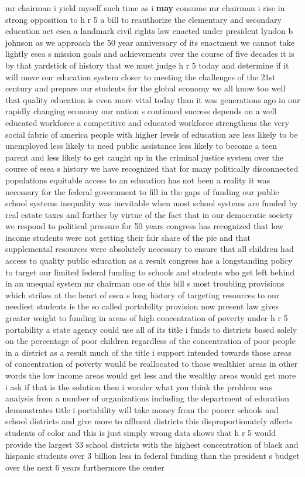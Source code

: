 \documentclass{article}
\begin{document}
\vspace{8mm}
mr chairman i yield myself such time as i {\bf \color{red} may} consume mr chairman i rise in strong opposition to h r 5 a bill to reauthorize the elementary and secondary education act esea a landmark civil rights law enacted under president lyndon b johnson as we approach the 50 year anniversary of its enactment we cannot take lightly esea s mission goals and achievements over the course of five decades it is by that yardstick of history that we must judge h r 5 today and determine if it will move our education system closer to meeting the challenges of the 21st century and prepare our students for the global economy we all know too well that quality education is even more vital today than it was generations ago in our rapidly changing economy our nation s continued success depends on a well educated workforce a competitive and educated workforce strengthens the very social fabric of america people with higher levels of education are less likely to be unemployed less likely to need public assistance less likely to become a teen parent and less likely to get caught up in the criminal justice system over the course of esea s history we have recognized that for many politically disconnected populations equitable access to an education has not been a reality it was necessary for the federal government to fill in the gaps of funding our public school systems inequality was inevitable when most school systems are funded by real estate taxes and further by virtue of the fact that in our democratic society we respond to political pressure for 50 years congress has recognized that low income students were not getting their fair share of the pie and that supplemental resources were absolutely necessary to ensure that all children had access to quality public education as a result congress has a longstanding policy to target our limited federal funding to schools and students who get left behind in an unequal system mr chairman one of this bill s most troubling provisions which strikes at the heart of esea s long history of targeting resources to our neediest students is the so called portability provision now present law gives greater weight to funding in areas of high concentration of poverty under h r 5 portability a state agency could use all of its title i funds to districts based solely on the percentage of poor children regardless of the concentration of poor people in a district as a result much of the title i support intended towards those areas of concentration of poverty would be reallocated to those wealthier areas in other words the low income areas would get less and the wealthy areas would get more i ask if that is the solution then i wonder what you think the problem was analysis from a number of organizations including the department of education demonstrates title i portability will take money from the poorer schools and school districts and give more to affluent districts this disproportionately affects students of color and this is just simply wrong data shows that h r 5 would provide the largest 33 school districts with the highest concentration of black and hispanic students over 3 billion less in federal funding than the president s budget over the next 6 years furthermore the center 
\end{document}
